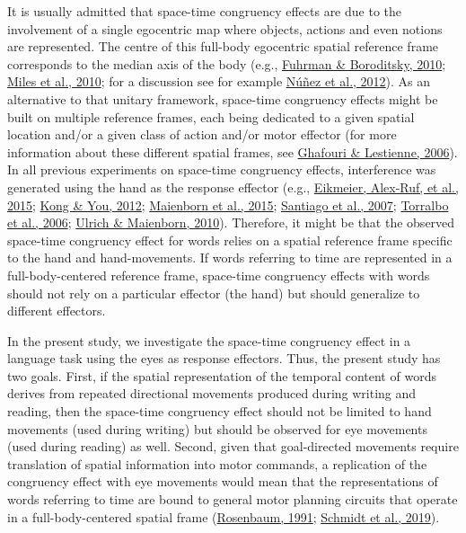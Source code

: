 \documentclass[
  a4paper,12pt,twoside,onecolumn,openright,final,oldfontcommands]{memoir}
\begin{document}
It is usually admitted that space-time congruency effects are due to the involvement of a single egocentric map where objects, actions and even notions are represented. The centre of this full-body egocentric spatial reference frame corresponds to the median axis of the body (e.g., \protect\hyperlink{ref-fuhrman_cross-cultural_2010}{Fuhrman \& Boroditsky, 2010}; \protect\hyperlink{ref-miles_mapping_2010}{Miles et al., 2010}; for a discussion see for example \protect\hyperlink{ref-nunez_contours_2012}{Núñez et al., 2012}). As an alternative to that unitary framework, space-time congruency effects might be built on multiple reference frames, each being dedicated to a given spatial location and/or a given class of action and/or motor effector (for more information about these different spatial frames, see \protect\hyperlink{ref-ghafouri_contribution_2006}{Ghafouri \& Lestienne, 2006}). In all previous experiments on space-time congruency effects, interference was generated using the hand as the response effector (e.g., \protect\hyperlink{ref-eikmeier_how_2015}{Eikmeier, Alex-Ruf, et al., 2015}; \protect\hyperlink{ref-kong_space-time_2012}{Kong \& You, 2012}; \protect\hyperlink{ref-maienborn_we_2015}{Maienborn et al., 2015}; \protect\hyperlink{ref-santiago_time_2007}{Santiago et al., 2007}; \protect\hyperlink{ref-torralbo_flexible_2006}{Torralbo et al., 2006}; \protect\hyperlink{ref-ulrich_leftright_2010}{Ulrich \& Maienborn, 2010}). Therefore, it might be that the observed space-time congruency effect for words relies on a spatial reference frame specific to the hand and hand-movements. If words referring to time are represented in a full-body-centered reference frame, space-time congruency effects with words should not rely on a particular effector (the hand) but should generalize to different effectors.

In the present study, we investigate the space-time congruency effect in a language task using the eyes as response effectors. Thus, the present study has two goals. First, if the spatial representation of the temporal content of words derives from repeated directional movements produced during writing and reading, then the space-time congruency effect should not be limited to hand movements (used during writing) but should be observed for eye movements (used during reading) as well. Second, given that goal-directed movements require translation of spatial information into motor commands, a replication of the congruency effect with eye movements would mean that the representations of words referring to time are bound to general motor planning circuits that operate in a full-body-centered spatial frame (\protect\hyperlink{ref-rosenbaum_human_1991}{Rosenbaum, 1991}; \protect\hyperlink{ref-schmidt_motor_2019}{Schmidt et al., 2019}).
\end{document}
